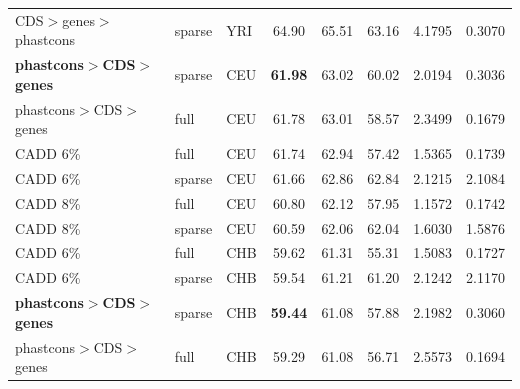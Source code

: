 \documentclass[11pt]{article}
\begin{document}
\begin{table}
\begin{tabular}{lll|crr|cc}
CDS$>$genes$>$phastcons &            sparse &          YRI &                        64.90 &             65.51 &            63.16 &                                 4.1795 &                                0.3070 \\
\textbf{phastcons$>$CDS$>$genes} &            sparse &          CEU &                        \textbf{61.98} &             63.02 &            60.02 &                                 2.0194 &                                0.3036 \\
phastcons$>$CDS$>$genes &              full &          CEU &                        61.78 &             63.01 &            58.57 &                                 2.3499 &                                0.1679 \\
               CADD 6\% &              full &          CEU &                        61.74 &             62.94 &            57.42 &                                 1.5365 &                                0.1739 \\
               CADD 6\% &            sparse &          CEU &                        61.66 &             62.86 &            62.84 &                                 2.1215 &                                2.1084 \\
               CADD 8\% &              full &          CEU &                        60.80 &             62.12 &            57.95 &                                 1.1572 &                                0.1742 \\
               CADD 8\% &            sparse &          CEU &                        60.59 &             62.06 &            62.04 &                                 1.6030 &                                1.5876 \\
               CADD 6\% &              full &          CHB &                        59.62 &             61.31 &            55.31 &                                 1.5083 &                                0.1727 \\
               CADD 6\% &            sparse &          CHB &                        59.54 &             61.21 &            61.20 &                                 2.1242 &                                2.1170 \\
               \textbf{phastcons$>$CDS$>$genes} &            sparse &          CHB &                        \textbf{59.44} &             61.08 &            57.88 &                                 2.1982 &                                0.3060 \\
phastcons$>$CDS$>$genes &              full &          CHB &                        59.29 &             61.08 &            56.71 &                                 2.5573 &                                0.1694 \\

\end{tabular}
\end{table}
\end{document}
